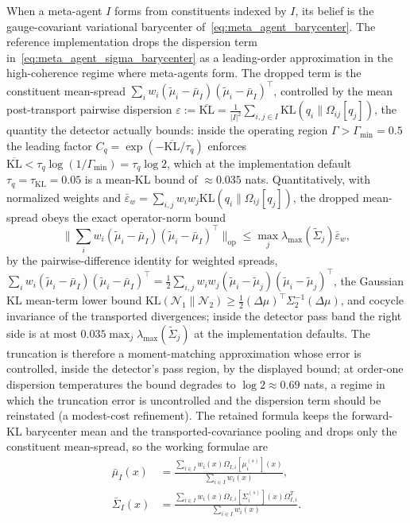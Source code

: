 \documentclass[11pt]{article}
\begin{document}
When a meta-agent $I$ forms from constituents indexed by $I$, its belief is the gauge-covariant variational barycenter of~\eqref{eq:meta_agent_barycenter}. The reference implementation drops the dispersion term in~\eqref{eq:meta_agent_sigma_barycenter} as a leading-order approximation in the high-coherence regime where meta-agents form. The dropped term is the constituent mean-spread $\sum_i w_i (\tilde{\mu}_i - \bar{\mu}_I)(\tilde{\mu}_i - \bar{\mu}_I)^\top$, controlled by the mean post-transport pairwise dispersion $\varepsilon := \overline{\mathrm{KL}} = \frac{1}{|I|^2}\sum_{i,j \in I} \mathrm{KL}(q_i \| \Omega_{ij}[q_j])$, the quantity the detector actually bounds: inside the operating region $\Gamma > \Gamma_{\min} = 0.5$ the leading factor $C_q = \exp(-\overline{\mathrm{KL}}/\tau_q)$ enforces $\overline{\mathrm{KL}} < \tau_q \log(1/\Gamma_{\min}) = \tau_q \log 2$, which at the implementation default $\tau_q = \tau_{\mathrm{KL}} = 0.05$ is a mean-KL bound of $\approx 0.035$ nats. Quantitatively, with normalized weights and $\bar{\varepsilon}_w = \sum_{i,j} w_i w_j \mathrm{KL}(q_i \| \Omega_{ij}[q_j])$, the dropped mean-spread obeys the exact operator-norm bound
\begin{equation}
\Big\|\sum_i w_i (\tilde{\mu}_i - \bar{\mu}_I)(\tilde{\mu}_i - \bar{\mu}_I)^\top\Big\|_{\mathrm{op}} \le \max_j \lambda_{\max}(\tilde{\Sigma}_j) \bar{\varepsilon}_w,
\label{eq:dispersion_drop_bound}
\end{equation}
by the pairwise-difference identity for weighted spreads, $\sum_i w_i (\tilde{\mu}_i - \bar{\mu}_I)(\tilde{\mu}_i - \bar{\mu}_I)^\top = \tfrac12\sum_{i,j} w_i w_j (\tilde{\mu}_i - \tilde{\mu}_j)(\tilde{\mu}_i - \tilde{\mu}_j)^\top$, the Gaussian KL mean-term lower bound $\mathrm{KL}(\mathcal{N}_1 \| \mathcal{N}_2) \ge \tfrac12(\Delta\mu)^\top\Sigma_2^{-1}(\Delta\mu)$, and cocycle invariance of the transported divergences; inside the detector pass band the right side is at most $0.035 \max_j \lambda_{\max}(\tilde{\Sigma}_j)$ at the implementation defaults. The truncation is therefore a moment-matching approximation whose error is controlled, inside the detector's pass region, by the displayed bound; at order-one dispersion temperatures the bound degrades to $\log 2 \approx 0.69$ nats, a regime in which the truncation error is uncontrolled and the dispersion term should be reinstated (a modest-cost refinement). The retained formula keeps the forward-KL barycenter mean and the transported-covariance pooling and drops only the constituent mean-spread, so the working formulae are
\begin{align}
\bar{\mu}_I(x) &= \frac{\sum_{i \in I} w_i(x) \Omega_{I,i}[\mu_i^{(s)}](x)}{\sum_{i \in I} w_i(x)},
\label{eq:meta_agent_mu_impl}
\\
\bar{\Sigma}_I(x) &= \frac{\sum_{i \in I} w_i(x) \Omega_{I,i}[\Sigma_i^{(s)}](x) \Omega_{I,i}^T}{\sum_{i \in I} w_i(x)}.
\label{eq:meta_agent_sigma_impl}
\end{align}
\end{document}
